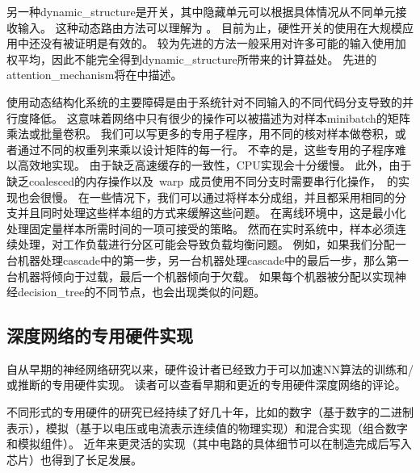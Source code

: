 另一种\gls{dynamic_structure}是开关，其中隐藏单元可以根据具体情况从不同单元接收输入。
这种动态路由方法可以理解为 \citep{Olshausen1993}。
目前为止，硬性开关的使用在大规模应用中还没有被证明是有效的。
较为先进的方法一般采用对许多可能的输入使用加权平均，因此不能完全得到\gls{dynamic_structure}所带来的计算益处。
先进的\gls{attention_mechanism}将在中描述。



使用动态结构化系统的主要障碍是由于系统针对不同输入的不同代码分支导致的并行度降低。
这意味着网络中只有很少的操作可以被描述为对样本\gls{minibatch}的矩阵乘法或批量卷积。
我们可以写更多的专用子程序，用不同的核对样本做卷积，或者通过不同的权重列来乘以设计矩阵的每一行。
不幸的是，这些专用的子程序难以高效地实现。
由于缺乏高速缓存的一致性，CPU实现会十分缓慢。
此外，由于缺乏\gls{coalesced}的内存操作以及~\gls{warp}~成员使用不同分支时需要串行化操作，~的实现也会很慢。
在一些情况下，我们可以通过将样本分成组，并且都采用相同的分支并且同时处理这些样本组的方式来缓解这些问题。
在离线环境中，这是最小化处理固定量样本所需时间的一项可接受的策略。
然而在实时系统中，样本必须连续处理，对工作负载进行分区可能会导致负载均衡问题。
例如，如果我们分配一台机器处理\gls{cascade}中的第一步，另一台机器处理\gls{cascade}中的最后一步，那么第一台机器将倾向于过载，最后一个机器倾向于欠载。
如果每个机器被分配以实现神经\gls{decision_tree}的不同节点，也会出现类似的问题。


\subsection{深度网络的专用硬件实现}
\label{sec:specialized_hardware_implementations_of_deep_networks}

自从早期的神经网络研究以来，硬件设计者已经致力于可以加速\gls{NN}算法的训练和/或推断的专用硬件实现。
读者可以查看早期和更近的专用硬件深度网络的评论\citep{Lindsey+Lindblad-1994,Beiu-et-al-2003,Misra+Saha-2010}。


不同形式的专用硬件\citep{Graf+Jackel-1989,Mead+Ismail-2012,Kim-et-al-2009,Pham-et-al-2012,Chen-et-al-IEEE2014,Chen-et-al-ACM2014}的研究已经持续了好几十年，比如的数字（基于数字的二进制表示），模拟\citep{Graf+Jackel-1989,Mead+Ismail-2012}（基于以电压或电流表示连续值的物理实现）和混合实现（组合数字和模拟组件）。
近年来更灵活的实现（其中电路的具体细节可以在制造完成后写入芯片）也得到了长足发展。




